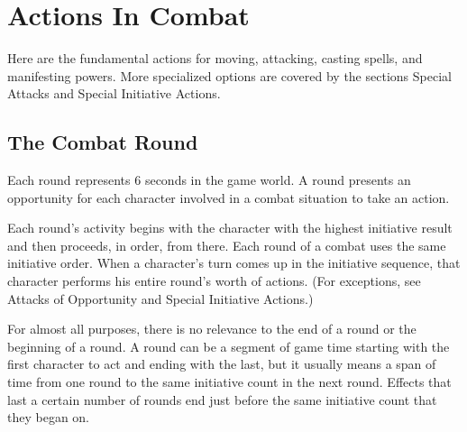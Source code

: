 \section{Actions In Combat}
Here are the fundamental actions for moving, attacking, casting spells, and manifesting powers. More specialized options are covered by the sections Special Attacks and Special Initiative Actions.

\subsection{The Combat Round}
Each round represents 6 seconds in the game world. A round presents an opportunity for each character involved in a combat situation to take an action.

Each round's activity begins with the character with the highest initiative result and then proceeds, in order, from there. Each round of a combat uses the same initiative order. When a character's turn comes up in the initiative sequence, that character performs his entire round's worth of actions. (For exceptions, see Attacks of Opportunity and Special Initiative Actions.)

For almost all purposes, there is no relevance to the end of a round or the beginning of a round. A round can be a segment of game time starting with the first character to act and ending with the last, but it usually means a span of time from one round to the same initiative count in the next round. Effects that last a certain number of rounds end just before the same initiative count that they began on.










